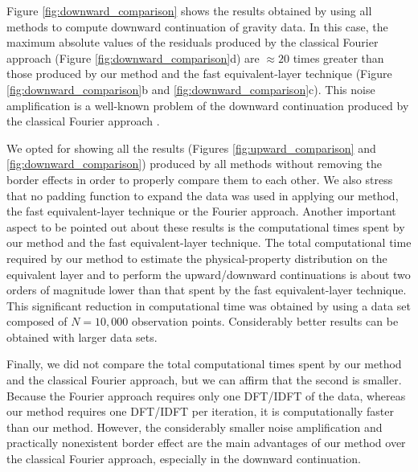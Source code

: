 Figure \ref{fig:downward_comparison} shows the results obtained by using all 
methods to compute downward continuation of gravity data.
In this case, the maximum absolute values of the residuals produced by the 
classical Fourier approach (Figure \ref{fig:downward_comparison}d) are 
$\approx 20$ times greater than those produced by our method and the fast equivalent-layer technique (Figure \ref{fig:downward_comparison}b and \ref{fig:downward_comparison}c).
This noise amplification is a well-known problem of the downward continuation 
produced by the classical Fourier approach \citep[e.g., ][ p. 320]{blakely1996}.

We opted for showing all the results (Figures \ref{fig:upward_comparison} and 
\ref{fig:downward_comparison}) produced by all methods without removing the border 
effects in order to properly compare them to each other.
We also stress that no padding function to expand the data was used in applying 
our method, the fast equivalent-layer technique or the Fourier approach.
Another important aspect to be pointed out about these results 
is the computational times spent by our method and the fast equivalent-layer technique. 
The total computational time required by our method to estimate the physical-property 
distribution on the equivalent layer and to perform the upward/downward continuations 
is about two orders of magnitude lower than that spent by the fast equivalent-layer technique.
This significant reduction in computational time was obtained by using a data set 
composed of $N = 10,000$ observation points. Considerably better results can be 
obtained with larger data sets.

Finally, we did not compare the total computational times spent by our method 
and the classical Fourier approach, but we can affirm that the second is smaller. 
Because  the Fourier approach requires only one DFT/IDFT of the data, whereas 
our method requires one DFT/IDFT per iteration, it is computationally faster 
than our method.
However, the considerably smaller noise amplification and practically nonexistent 
border effect are the main advantages of our method over the classical Fourier 
approach, especially in the downward continuation.
